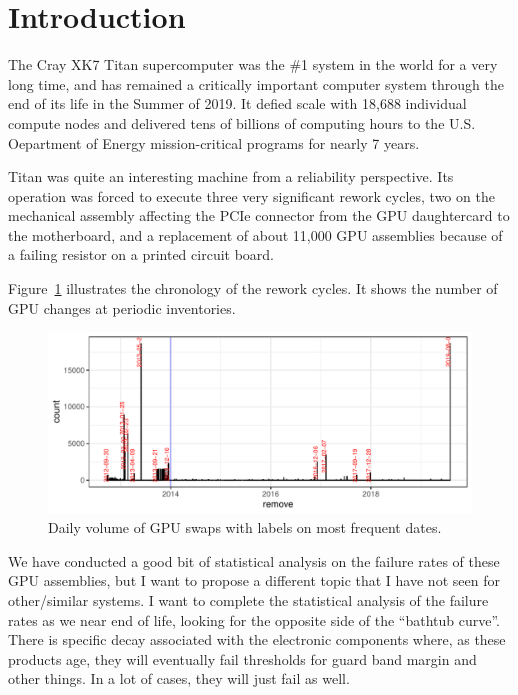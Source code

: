 \section{Introduction}
\label{section:introduction}

The Cray XK7 Titan supercomputer was the \#1 system in the world for a
very long time, and has remained a critically important computer
system through the end of its life in the Summer of 2019. It defied
scale with 18,688 individual compute nodes and delivered tens of
billions of computing hours to the U.S. Oepartment of Energy
mission-critical programs for nearly 7 years.
 
Titan was quite an interesting machine from a reliability perspective.
Its operation was forced to execute three very significant rework cycles, two on
the mechanical assembly affecting the PCIe connector from the GPU
daughtercard to the motherboard, and a replacement of about 11,000 GPU
assemblies because of a failing resistor on a printed circuit board.

Figure~\ref{fig:chronology} illustrates the chronology of the rework
cycles. It shows the number of GPU changes at periodic inventories.
\begin{figure}[tbp]
  \centering
  \includegraphics[width=\textwidth]{figs/chronology001.pdf}
  \caption{Daily volume of GPU swaps with labels on most frequent dates.}
  \label{fig:chronology}
\end{figure}
 
We have conducted a good bit of statistical analysis on the failure
rates of these GPU assemblies, but I want to propose a different topic
that I have not seen for other/similar systems.  I want to complete
the statistical analysis of the failure rates as we near end of life,
looking for the opposite side of the “bathtub curve”.  There is
specific decay associated with the electronic components where, as
these products age, they will eventually fail thresholds for guard
band margin and other things. In a lot of cases, they will just fail
as well. 
 
